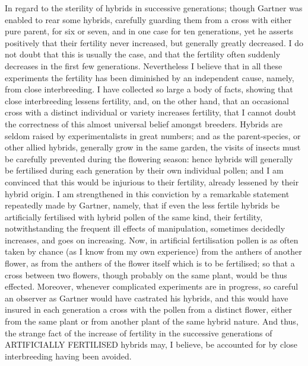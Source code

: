 In regard to the sterility of hybrids in successive generations; though Gartner was enabled to rear some hybrids, carefully guarding them from a cross with either pure parent, for six or seven, and in one case for ten generations, yet he asserts positively that their fertility never increased, but generally greatly decreased. I do not doubt that this is usually the case, and that the fertility often suddenly decreases in the first few generations. Nevertheless I believe that in all these experiments the fertility has been diminished by an independent cause, namely, from close interbreeding. I have collected so large a body of facts, showing that close interbreeding lessens fertility, and, on the other hand, that an occasional cross with a distinct individual or variety increases fertility, that I cannot doubt the correctness of this almost universal belief amongst breeders. Hybrids are seldom raised by experimentalists in great numbers; and as the parent-species, or other allied hybrids, generally grow in the same garden, the visits of insects must be carefully prevented during the flowering season: hence hybrids will generally be fertilised during each generation by their own individual pollen; and I am convinced that this would be injurious to their fertility, already lessened by their hybrid origin. I am strengthened in this conviction by a remarkable statement repeatedly made by Gartner, namely, that if even the less fertile hybrids be artificially fertilised with hybrid pollen of the same kind, their fertility, notwithstanding the frequent ill effects of manipulation, sometimes decidedly increases, and goes on increasing. Now, in artificial fertilisation pollen is as often taken by chance (as I know from my own experience) from the anthers of another flower, as from the anthers of the flower itself which is to be fertilised; so that a cross between two flowers, though probably on the same plant, would be thus effected. Moreover, whenever complicated experiments are in progress, so careful an observer as Gartner would have castrated his hybrids, and this would have insured in each generation a cross with the pollen from a distinct flower, either from the same plant or from another plant of the same hybrid nature. And thus, the strange fact of the increase of fertility in the successive generations of ARTIFICIALLY FERTILISED hybrids may, I believe, be accounted for by close interbreeding having been avoided.
